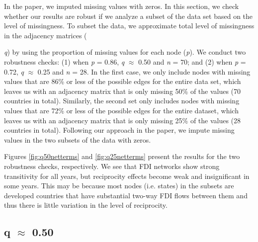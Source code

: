 \documentclass[reqno,onecolumn,letterpaper,12pt]{article}
\begin{document}
In the paper, we imputed missing values with zeros. In this section, we check whether our results are robust if we analyze a subset of the data set based on the level of missingness. To subset the data, we approximate total level of missingness in the adjacency matrices ({\emph{q}) by using the proportion of missing values for each node (\emph{p}). We conduct two robustness checks: (1) when \emph{p} = 0.86,  \emph{q} $\approx$ 0.50 and  \emph{n} = 70; and (2) when \emph{p} = 0.72, \emph{q} $\approx$ 0.25 and  \emph{n} = 28. In the first case, we only include nodes with missing values that are 86\% or less of the possible edges for the entire data set, which leaves us with an adjacency matrix that is only missing 50\% of the values (70 countries in total). Similarly, the second set only includes nodes with missing values that are 72\% or less of the possible edges for the entire dataset, which leaves us with an adjacency matrix that is only missing 25\% of the values (28 countries in total).  Following our approach in the paper, we impute missing values in the two subsets of the data with zeros.

Figures \ref{fig:q50netterms} and \ref{fig:q25netterms} present the results for the two robustness checks, respectively. We see that FDI networks show strong transitivity for all years, but reciprocity effects become weak and insignificant in some years. This may be because most nodes (i.e. states) in the subsets are developed countries that have substantial two-way FDI flows between them and thus there is little variation in the level of reciprocity.


\subsection{q $\approx$  0.50}

}
\end{document}
